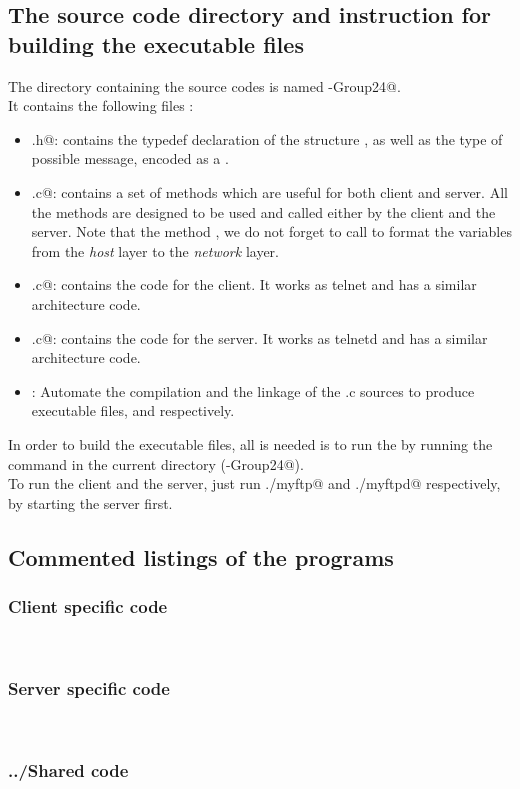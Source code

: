\documentclass{article}
\begin{document}
\subsection{The source code directory and instruction for building the executable files}
The directory containing the source codes is named -Group24@.  \\
It contains the following files : 
\begin{itemize}
\item \verb@header.h@: contains the typedef declaration of the structure \verb@msgHeader@, as well as the type of possible message, encoded as a \verb@int@.
\item \verb@utils.c@: contains a set of methods which are useful for both client and server. All the methods are designed to be used and called either by the client and the server. Note that the method \verb@sendType@, we do not forget to call \verb@htonl@ to format the \verb@int@ variables from the \textit{host} layer to the \textit{network} layer.
\item \verb@myftp.c@: contains the code for the client. It works as telnet and has a similar architecture code.
\item \verb@myftpd.c@: contains the code for the server. It works as telnetd and has a similar architecture code.
\item \verb@Makefile@: Automate the compilation and the linkage of the .c sources to produce executable files, \verb@myftp@ and \verb@myftpd@ respectively.
\end{itemize}
In order to build the executable files, all is needed is to run the \verb@Makefile@ by running the \verb@make@ command in the current directory (-Group24@).\\

To run the client and the server, just run \verb@./myftp@ and \verb@./myftpd@ respectively, by starting the server first.
\subsection{Commented listings of the programs}
 \subsubsection{Client specific code}~
    
    \subsubsection{Server specific code}~
    
    \subsubsection{../Shared code}~
    
    
    
\end{document}
